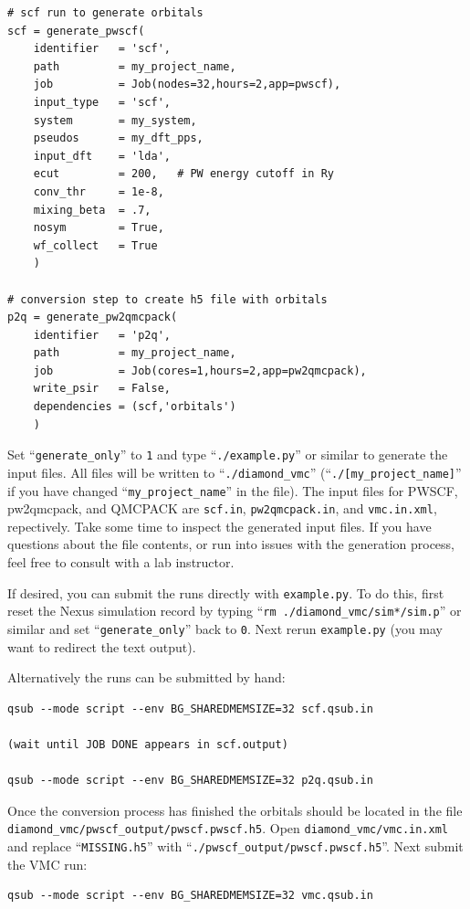 \begin{lstlisting}
# scf run to generate orbitals
scf = generate_pwscf(
    identifier   = 'scf',
    path         = my_project_name,
    job          = Job(nodes=32,hours=2,app=pwscf),
    input_type   = 'scf',
    system       = my_system,
    pseudos      = my_dft_pps,
    input_dft    = 'lda', 
    ecut         = 200,   # PW energy cutoff in Ry
    conv_thr     = 1e-8, 
    mixing_beta  = .7,
    nosym        = True,
    wf_collect   = True
    )

# conversion step to create h5 file with orbitals
p2q = generate_pw2qmcpack(
    identifier   = 'p2q',
    path         = my_project_name,
    job          = Job(cores=1,hours=2,app=pw2qmcpack),
    write_psir   = False,
    dependencies = (scf,'orbitals')
    )
\end{lstlisting}

Set ``\texttt{generate\_only}'' to \texttt{1} and type ``\texttt{./example.py}'' or similar to generate the input files.  All files will be written to ``\texttt{./diamond\_vmc}'' (``\texttt{./[my\_project\_name]}'' if you have changed ``\texttt{my\_project\_name}'' in the file).  The input files for PWSCF, pw2qmcpack, and QMCPACK are \texttt{scf.in}, \texttt{pw2qmcpack.in}, and \texttt{vmc.in.xml}, repectively.  Take some time to inspect the generated input files.  If you have questions about the file contents, or run into issues with the generation process, feel free to consult with a lab instructor.  

If desired, you can submit the runs directly with \texttt{example.py}.  To do this, first reset the Nexus simulation record by typing ``\texttt{rm ./diamond\_vmc/sim*/sim.p}'' or similar and set ``\texttt{generate\_only}'' back to \texttt{0}.  Next rerun \texttt{example.py}  (you may want to redirect the text output).  

Alternatively the runs can be submitted by hand:
\begin{shaded}
\begin{verbatim}
qsub --mode script --env BG_SHAREDMEMSIZE=32 scf.qsub.in

(wait until JOB DONE appears in scf.output)

qsub --mode script --env BG_SHAREDMEMSIZE=32 p2q.qsub.in
\end{verbatim}
\end{shaded}
Once the conversion process has finished the orbitals should be located in the file \texttt{diamond\_vmc/pwscf\_output/pwscf.pwscf.h5}.  Open \texttt{diamond\_vmc/vmc.in.xml} and replace ``\texttt{MISSING.h5}'' with ``\texttt{./pwscf\_output/pwscf.pwscf.h5}''.  Next submit the VMC run:
\begin{shaded}
\begin{verbatim}
qsub --mode script --env BG_SHAREDMEMSIZE=32 vmc.qsub.in
\end{verbatim}
\end{shaded}


